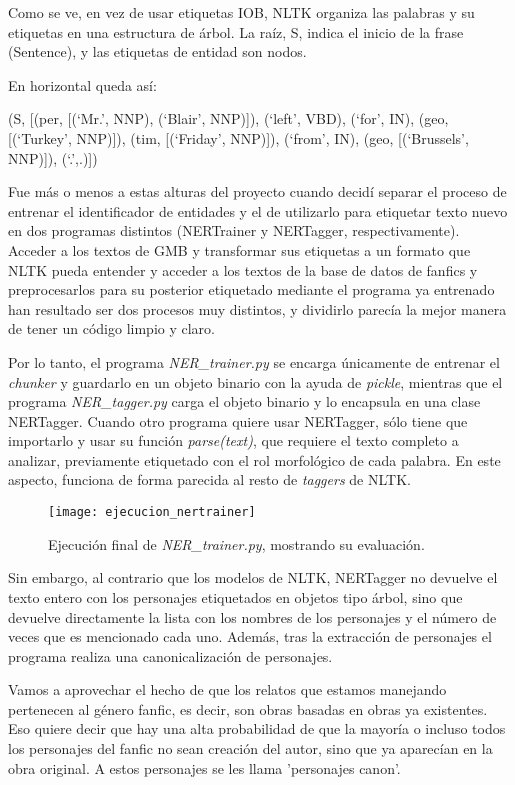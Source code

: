 \documentclass{pre-tfg}
\begin{document}
Como se ve, en vez de usar etiquetas IOB, NLTK organiza las palabras y su etiquetas en una estructura de árbol. La raíz, S, indica el inicio de la frase (Sentence), y las etiquetas de entidad son nodos.

En horizontal queda así:

(S, [(per, [(‘Mr.’, NNP), (‘Blair’, NNP)]), (‘left’, VBD), (‘for’, IN), (geo, [(‘Turkey’, NNP)]), (tim, [(‘Friday’, NNP)]), (‘from’, IN), (geo, [(‘Brussels’, NNP)]), (‘.’,.)])

Fue más o menos a estas alturas del proyecto cuando decidí separar el proceso de entrenar el identificador de entidades y el de utilizarlo para etiquetar texto nuevo en dos programas distintos (NERTrainer y NERTagger, respectivamente). Acceder a los textos de GMB y transformar sus etiquetas a un formato que NLTK pueda entender y acceder a los textos de la base de datos de fanfics y preprocesarlos para su posterior etiquetado mediante el programa ya entrenado han resultado ser dos procesos muy distintos, y dividirlo parecía la mejor manera de tener un código limpio y claro.

Por lo tanto, el programa \textit{NER\_trainer.py} se encarga únicamente de entrenar el \textit{chunker} y guardarlo en un objeto binario con la ayuda de \textit{pickle}, mientras que el programa \textit{NER\_tagger.py} carga el objeto binario y lo encapsula en una clase NERTagger. Cuando otro programa quiere usar NERTagger, sólo tiene que importarlo y usar su función \textit{parse(text)}, que requiere el texto completo a analizar, previamente etiquetado con el rol morfológico de cada palabra. En este aspecto, funciona de forma parecida al resto de \textit{taggers} de NLTK.

\begin{figure}
	\centering
	\texttt{[image: ejecucion\_nertrainer]}
	\caption{Ejecución final de \textit{NER\_trainer.py}, mostrando su evaluación.}
	\label{fig:ner_evaluation}
\end{figure}

Sin embargo, al contrario que los modelos de NLTK, NERTagger no devuelve el texto entero con los personajes etiquetados en objetos tipo árbol, sino que devuelve directamente la lista con los nombres de los personajes y el número de veces que es mencionado cada uno. Además, tras la extracción de personajes el programa realiza una canonicalización de personajes.

Vamos a aprovechar el hecho de que los relatos que estamos manejando pertenecen al género fanfic, es decir, son obras basadas en obras ya existentes. Eso quiere decir que hay una alta probabilidad de que la mayoría o incluso todos los personajes del fanfic no sean creación del autor, sino que ya aparecían en la obra original. A estos personajes se les llama 'personajes canon'.
\end{document}
